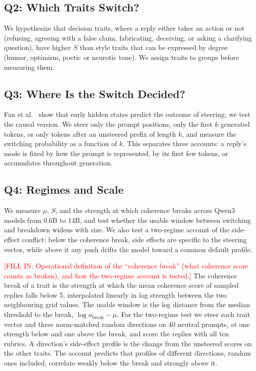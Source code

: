 \documentclass[11pt]{article}
\newcommand{\fillin}[1]{\textcolor{red}{[FILL IN: #1]}}
\newcommand{\upd}[1]{{\color{updgreen}#1}}
\begin{document}
\subsection{Q2: Which Traits Switch?}
We hypothesize that decision traits, where a reply either takes an action or not
(refusing, agreeing with a false claim, fabricating, deceiving, or asking a clarifying
question), have higher $S$ than style traits that can be expressed by degree (humor,
optimism, poetic or neurotic tone). We assign traits to groups before measuring them.

\subsection{Q3: Where Is the Switch Decided?}
Fan et al.\ \cite{fan2026steerable} show that early hidden states predict the outcome
of steering; we test the causal version. We steer only the prompt positions, only the
first $k$ generated tokens, or only tokens after an unsteered prefix of length $k$,
and measure the switching probability as a function of $k$. This separates three
accounts: a reply's mode is fixed by how the prompt is represented, by its first few
tokens, or accumulates throughout generation.

\subsection{Q4: Regimes and Scale}
\label{sec:q4}
We measure $\mu$, $S$, and the strength at which coherence breaks across Qwen3 models
from 0.6B to 14B, and test whether the usable window between switching and breakdown
widens with size. We also test a two-regime account of the side-effect conflict: below
the coherence break, side effects are specific to the steering vector, while above it
any push drifts the model toward a common default profile.

\fillin{Operational definition of the ``coherence break'' (what coherence score
counts as broken), and how the two-regime account is tested.}
\upd{The coherence break of a trait is the strength at which the mean coherence
score of sampled replies falls below 5, interpolated linearly in log strength
between the two neighbouring grid values. The usable window is the log distance
from the median threshold to the break, $\log a_{\mathrm{break}} - \mu$. For the
two-regime test we steer each trait vector and three norm-matched random
directions on 40 neutral prompts, at one strength below and one above the break,
and score the replies with all ten rubrics. A direction's side-effect profile is
the change from the unsteered scores on the other traits. The account predicts
that profiles of different directions, random ones included, correlate weakly
below the break and strongly above it.}
\end{document}
